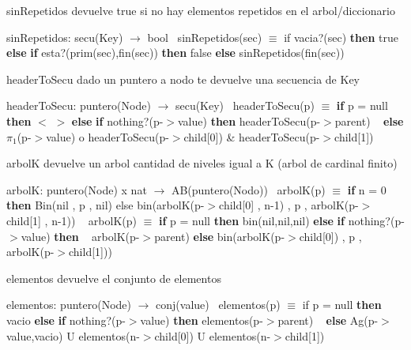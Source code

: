 \begin{DoxyParagraph}{sin\+Repetidos}
devuelve true si no hay elementos repetidos en el arbol/diccionario

sin\+Repetidos\+: secu(\+Key) $\to$ bool~\newline
 sin\+Repetidos(sec) $\equiv$ if vacia?(sec) {\bfseries then} true {\bfseries else} {\bfseries if} esta?(prim(sec),fin(sec)) {\bfseries then} false {\bfseries else} sin\+Repetidos(fin(sec)) 
\end{DoxyParagraph}


\begin{DoxyParagraph}{header\+To\+Secu}
dado un puntero a nodo te devuelve una secuencia de Key

header\+To\+Secu\+: puntero(\+Node) $\to$ secu(\+Key)~\newline
 header\+To\+Secu(p) $\equiv$ {\bfseries if} p = null {\bfseries then} $<$ $>$ {\bfseries else} {\bfseries if} nothing?(p-\/$>$value) {\bfseries then} header\+To\+Secu(p-\/$>$parent) ~\newline
 {\bfseries else} $\pi_1$(p-\/$>$value) o header\+To\+Secu(p-\/$>$child\mbox{[}0\mbox{]}) \& header\+To\+Secu(p-\/$>$child\mbox{[}1\mbox{]}) 
\end{DoxyParagraph}


\begin{DoxyParagraph}{arbolK}
devuelve un arbol cantidad de niveles igual a K (arbol de cardinal finito)

arbolK\+: puntero(\+Node) x nat $\to$ A\+B(puntero(\+Nodo))~\newline
 arbol\+K(p) $\equiv$ {\bfseries if} n = 0 {\bfseries then} Bin(nil , p , nil) else bin(arbolK(p-\/$>$child\mbox{[}0\mbox{]} , n-\/1) , p , arbolK(p-\/$>$child\mbox{[}1\mbox{]} , n-\/1)) ~\newline
 arbol\+K(p) $\equiv$ {\bfseries if} p = null {\bfseries then} bin(nil,nil,nil) {\bfseries else} {\bfseries if} nothing?(p-\/$>$value) {\bfseries then} ~\newline
 arbolK(p-\/$>$parent) {\bfseries else} bin(arbolK(p-\/$>$child\mbox{[}0\mbox{]}) , p , arbolK(p-\/$>$child\mbox{[}1\mbox{]})) 
\end{DoxyParagraph}


\begin{DoxyParagraph}{elementos}
devuelve el conjunto de elementos

elementos\+: puntero(\+Node) $\to$ conj(value)~\newline
 elementos(p) $\equiv$ if p = null {\bfseries then} vacio {\bfseries else} {\bfseries if} nothing?(p-\/$>$value) {\bfseries then} elementos(p-\/$>$parent) ~\newline
 {\bfseries else} Ag(p-\/$>$value,vacio) U elementos(n-\/$>$child\mbox{[}0\mbox{]}) U elementos(n-\/$>$child\mbox{[}1\mbox{]}) 
\end{DoxyParagraph}


